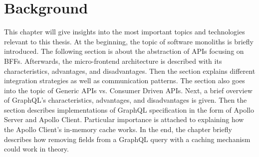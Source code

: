 \chapter{Background}\label{chapter:background}

This chapter will give insights into the most important topics and technologies relevant to this thesis. At the beginning, the topic of software monoliths is briefly introduced. The following section is about the abstraction of \acp{API} focusing on \acp{BFF}. Afterwards, the micro-frontend architecture is described with its characteristics, advantages, and disadvantages. Then the section explains different integration strategies as well as communication patterns. The section also goes into the topic of Generic \acp{API} vs. Consumer Driven \acp{API}. Next, a brief overview of GraphQL's characteristics, advantages, and disadvantages is given. Then the section describes implementations of GraphQL specification in the form of Apollo Server and Apollo Client. Particular importance is attached to explaining how the Apollo Client's in-memory cache works. In the end, the chapter briefly describes how removing fields from a GraphQL query with a caching mechanism could work in theory.









